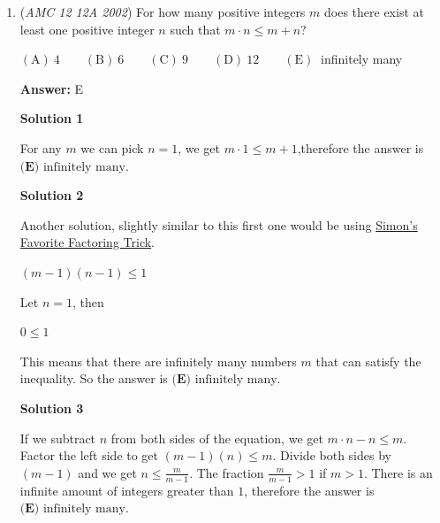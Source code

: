 \begin{enumerate}
$\text{(A)}\ \pi \qquad \text{(B)}\ 1.5\pi \qquad \text{(C)}\ 2\pi \qquad \text{(D)}\ 3\pi \qquad \text{(E)}\ 3.5\pi$

 \textbf{Answer: }C



\textbf{Solution}

The outer circle has radius $1+1+1=3$, and thus area $9\pi$. The little circles have area $\pi$ each; since there are 7, their total area is $7\pi$. Thus, our answer is $9\pi-7\pi=\boxed{2\pi\Rightarrow \textbf{(C)}}$.

 


	\item (\textit{AMC 12 12A 2002}) For how many positive integers $m$ does there exist at least one positive integer $n$ such that $m \cdot n \le m + n$?


 $\mathrm{(A) \ } 4\qquad \mathrm{(B) \ } 6\qquad \mathrm{(C) \ } 9\qquad \mathrm{(D) \ } 12\qquad \mathrm{(E) \ }$  infinitely many


 
 \textbf{Answer: }E



\textbf{Solution 1}

For any $m$ we can pick $n=1$, we get $m \cdot 1 \le m + 1$,therefore the answer is $\boxed{\textbf{(E) } \text{infinitely many}}$.

 



\textbf{Solution 2}

Another solution, slightly similar to this first one would be using \href{https://artofproblemsolving.com/wiki/index.php?title=Simon\%27s\_Favorite\_Factoring\_Trick}{Simon's Favorite Factoring Trick}.

 $(m-1)(n-1) \leq 1$

 Let $n=1$, then

 $0 \leq 1$

 This means that there are infinitely many numbers $m$ that can satisfy the inequality. So the answer is $\boxed{\textbf{(E) } \text{infinitely many}}$.

 



\textbf{Solution 3}

If we subtract $n$ from both sides of the equation, we get $m \cdot n - n \le m$. Factor the left side to get $(m - 1)(n) \le m$. Divide both sides by $(m-1)$ and we get $n \le \frac {m}{m-1}$. The fraction $\frac {m}{m-1} > 1$ if $m > 1$. There is an infinite amount of integers greater than $1$, therefore the answer is $\boxed{\textbf{(E) } \text{infinitely many}}$.


\end{enumerate}
